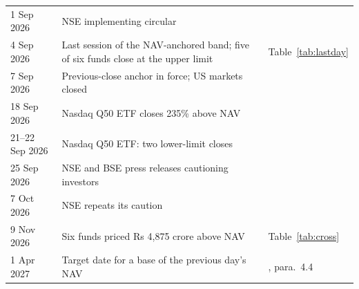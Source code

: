 \begin{table}[H]
\begin{tabularx}{\textwidth}{L{2.6cm}YL{3.3cm}}
1 Sep 2026 & NSE implementing circular & \citet{nse2026circular}\\
4 Sep 2026 & Last session of the NAV-anchored band; five of six funds close at the upper limit & Table~\ref{tab:lastday}\\
7 Sep 2026 & Previous-close anchor in force; US markets closed & \citet{nse2026files}\\
18 Sep 2026 & Nasdaq Q50 ETF closes 235\% above NAV & \citet{indmoney2026unwind}\\
21--22 Sep 2026 & Nasdaq Q50 ETF: two lower-limit closes & \citet{indmoney2026unwind}\\
25 Sep 2026 & NSE and BSE press releases cautioning investors & \citet{nse2026press,bse2026press}\\
7 Oct 2026 & NSE repeats its caution & \citet{reuters2026nse}\\
9 Nov 2026 & Six funds priced Rs 4,875 crore above NAV & Table~\ref{tab:cross}\\
1 Apr 2027 & Target date for a base of the previous day's NAV & \citet{sebi2026circular}, para.\ 4.4\\
\bottomrule
\end{tabularx}
\end{table}
